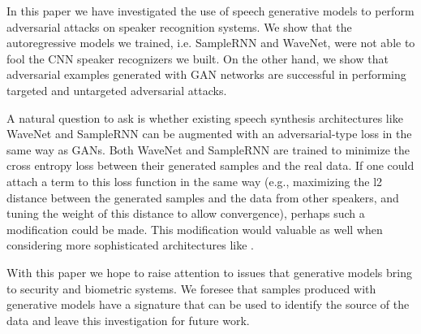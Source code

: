 

In this paper we have investigated the use of speech generative models to perform adversarial attacks on speaker recognition systems. We show that the autoregressive models we trained, i.e. SampleRNN and WaveNet, were not able to fool the CNN speaker recognizers we built. On the other hand, we show that adversarial examples generated with GAN networks are successful in performing targeted and untargeted adversarial attacks.

A natural question to ask is whether existing speech synthesis architectures like WaveNet and SampleRNN can be augmented with an adversarial-type loss in the same way as GANs. Both WaveNet and SampleRNN are trained to minimize the cross entropy loss between their generated samples and the real data. If one could attach a term to this loss function in the same way (e.g., maximizing the l2 distance between the generated samples and the data from other speakers, and tuning the weight of this distance to allow convergence), perhaps such a modification could be made. This modification would valuable as well when considering more sophisticated architectures like \cite{wang2017tacotron}.

With this paper we hope to raise attention to issues that generative models bring to security and biometric systems. We foresee that samples produced with generative models have a signature that can be used to identify the source of the data and leave this investigation for future work.
